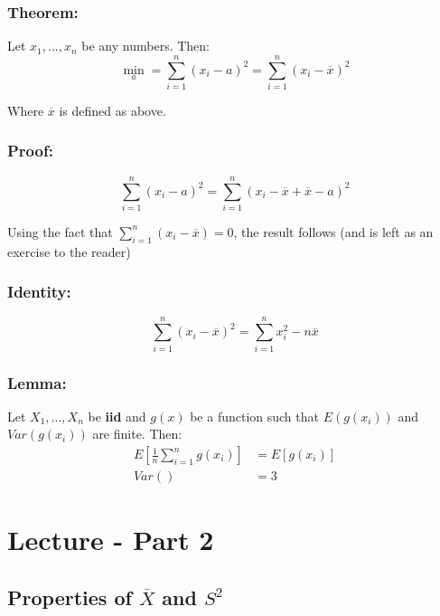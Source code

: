 \documentclass{article}
\begin{document}
\subsubsection*{Theorem:}
Let $x_1,...,x_n$ be any numbers. Then:
\begin{equation*}
    \min_{a} = \sum_{i=1}^n (x_i-a)^2 = \sum_{i=1}^n (x_i - \overline{x})^2
\end{equation*}

Where $\overline{x}$ is defined as above.
\subsubsection*{Proof:}
\begin{equation*}
    \sum_{i=1}^n (x_i-a)^2 = \sum_{i=1}^n (x_i - \overline{x} + \overline{x} - a)^2
\end{equation*}

Using the fact that $\sum_{i=1}^n (x_i - \overline{x}) = 0$, the result follows (and is left as an exercise to the reader)

\subsubsection*{Identity:}
\begin{equation*}
    \sum_{i=1}^n (x_i - \overline{x})^2 = \sum_{i=1}^n x_i^2 - n\overline{x}
\end{equation*}

\subsubsection*{Lemma:}
Let $X_1,...,X_n$ be \textbf{iid} and $g(x)$ be a function such that $E(g(x_i))$ and $Var(g(x_i))$ are finite. Then:
\begin{equation*}
    \begin{split}
        E\left[\frac{1}{n}\sum_{i=1}^n g(x_i) \right] &= E[g(x_i)]\\
        Var() &= 3
    \end{split}
\end{equation*}

\section{Lecture - Part 2}
\subsection{Properties of $\overline{X}$ and $S^2$}
\end{document}
